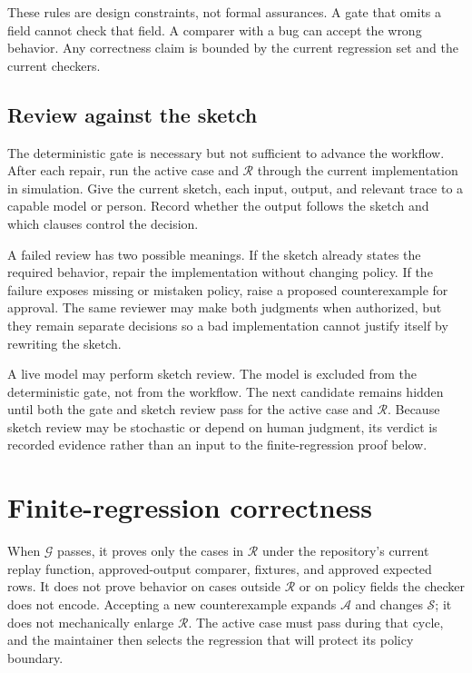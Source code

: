 \documentclass[11pt]{article}
\newcommand{\sketch}{\mathcal{S}}
\newcommand{\archive}{\mathcal{A}}
\newcommand{\regression}{\mathcal{R}}
\newcommand{\gate}{\mathcal{G}}
\begin{document}
These rules are design constraints, not formal assurances.  A gate that omits a field cannot
check that field.  A comparer with a bug can accept the wrong behavior.  Any correctness claim
is bounded by the current regression set and the current checkers.

\subsection{Review against the sketch}

The deterministic gate is necessary but not sufficient to advance the workflow.  After each
repair, run the active case and $\regression$ through the current implementation in simulation.
Give the current sketch, each input, output, and relevant trace to a capable model or person.
Record whether the output follows the sketch and which clauses control the decision.

A failed review has two possible meanings.  If the sketch already states the required behavior,
repair the implementation without changing policy.  If the failure exposes missing or mistaken
policy, raise a proposed counterexample for approval.  The same reviewer may make both judgments
when authorized, but they remain separate decisions so a bad implementation cannot justify
itself by rewriting the sketch.

A live model may perform sketch review.  The model is excluded from the deterministic gate, not
from the workflow.  The next candidate remains hidden until both the gate and sketch review pass
for the active case and $\regression$.  Because sketch review may be stochastic or depend on
human judgment, its verdict is recorded evidence rather than an input to the finite-regression
proof below.

\section{Finite-regression correctness}
\label{sec:correctness}

When $\gate$ passes, it proves only the cases in $\regression$ under the repository's current
replay function, approved-output comparer, fixtures, and approved expected rows.  It does not prove behavior on
cases outside $\regression$ or on policy fields the checker does not encode.  Accepting a new
counterexample expands $\archive$ and changes $\sketch$; it does not mechanically enlarge
$\regression$.  The active case must pass during that cycle, and the maintainer then selects the
regression that will protect its policy boundary.
\end{document}

